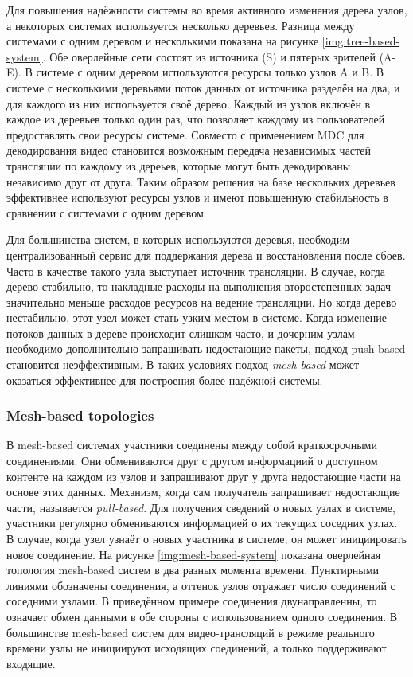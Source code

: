 		Для повышения надёжности системы во время активного изменения дерева узлов, а некоторых системах используется
		несколько деревьев. Разница между системами с одним деревом и несколькими показана на рисунке
		\ref{img:tree-based-system}. Обе оверлейные сети состоят из источника (S) и пятерых зрителей (A-E). В системе с
		одним деревом используются ресурсы только узлов A и B. В системе с несколькими деревьями поток данных от
		источника разделён на два, и для каждого из них используется своё дерево. Каждый из узлов включён в каждое из
		деревьев только один раз, что позволяет каждому из пользователей предоставлять свои ресурсы системе. Совместо с
		применением MDC для декодирования видео становится возможным передача независимых частей трансляции по каждому
		из дереьев, которые могут быть декодированы независимо друг от друга. Таким образом решения на базе нескольких
		деревьев эффективнее используют ресурсы узлов и имеют повышенную стабильность в сравнении с системами с одним
		деревом.

		Для большинства систем, в которых используются деревья, необходим централизованный сервис для поддержания дерева
		и восстановления после сбоев. Часто в качестве такого узла выступает источник трансляции. В случае, когда дерево
		стабильно, то накладные расходы на выполнения второстепенных задач значительно меньше расходов ресурсов на
		ведение трансляции. Но когда дерево нестабильно, этот узел может стать узким местом в системе. Когда изменение
		потоков данных в дереве происходит слишком часто, и дочерним узлам необходимо дополнительно запрашивать
		недостающие пакеты, подход push-based становится неэффективным. В таких условиях подход \textit{mesh-based}
		может оказаться эффективнее для построения более надёжной системы.

		\subsubsection{Mesh-based topologies}
		В mesh-based системах участники соединены между собой краткосрочными соединениями. Они обмениваются друг с
		другом информациий о доступном контенте на каждом из узлов и запрашивают друг у друга недостающие части на
		основе этих данных. Механизм, когда сам получатель запрашивает недостающие части, называется \textit{pull-based}.
		Для получения сведений о новых узлах в системе, участники регулярно обмениваются информацией о их текущих
		соседних узлах. В случае, когда узел узнаёт о новых участника в системе, он может инициировать новое соединение.
		На рисунке \ref{img:mesh-based-system} показана оверлейная топология mesh-based систем в два разных момента
		времени. Пунктирными линиями обозначены соединения, а оттенок узлов отражает число соединений с соседними узлами.
		В приведённом примере соединения двунаправленны, то означает обмен данными в обе стороны с использованием одного
		соединения. В большинстве mesh-based систем для видео-трансляций в режиме реального времени узлы не инициируют
		исходящих соединений, а только поддерживают входящие.

